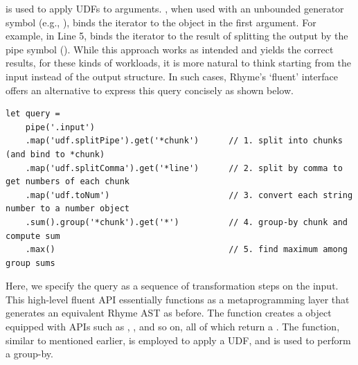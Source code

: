 \documentclass[runningheads]{llncs}
\newcommand{\lang}{Rhyme}
\begin{document}
 is used to apply UDFs to arguments.
, when used with an unbounded generator symbol (e.g., ), binds the
iterator to the object in the first argument.
For example, in Line 5,  binds the iterator
 to the result of splitting the output by the pipe symbol (\inline{|}).
While this approach works as intended and yields the correct results, 
for these kinds of workloads, it is more natural to think starting from the input
instead of the output structure.
In such cases, \lang{}'s `fluent' interface offers an alternative to express
this query concisely as shown below.


\begin{lstlisting}[style=JavaScript, columns=flexible]
let query =
    pipe('.input')
    .map('udf.splitPipe').get('*chunk')      // 1. split into chunks (and bind to *chunk)
    .map('udf.splitComma').get('*line')      // 2. split by comma to get numbers of each chunk
    .map('udf.toNum')                        // 3. convert each string number to a number object
    .sum().group('*chunk').get('*')          // 4. group-by chunk and compute sum
    .max()                                   // 5. find maximum among group sums
\end{lstlisting}

Here, we specify the query as a sequence of transformation steps on the input.
This high-level fluent API essentially functions as a metaprogramming layer
that generates an equivalent \lang{} AST as before.
The  function creates a  object equipped with
APIs such as , , and so on, all of which return a
.
The  function, similar to  mentioned earlier,
is employed to apply a UDF, and  is used to perform a group-by.


\end{document}
